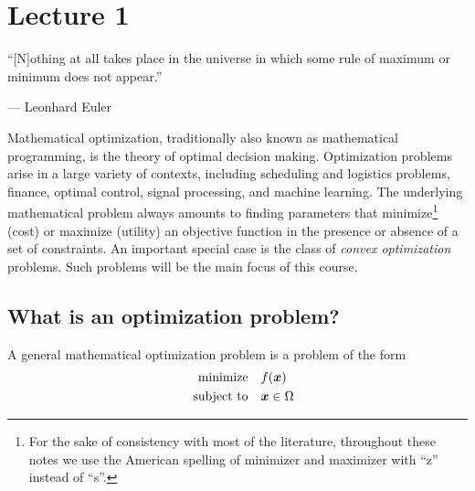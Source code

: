 %
%
% 


\chapter*{Lecture 1}
\addtocounter{chapter}{1}

\epigraph{``[N]othing at all takes place in the universe in which some rule of maximum or minimum does not appear.''}{--- \textup{Leonhard Euler}}

Mathematical optimization, traditionally also known as mathematical programming, is the theory of optimal decision making. Optimization problems arise in a large variety of contexts, including scheduling and logistics problems, finance, optimal control, signal processing, and machine learning. The underlying mathematical problem always amounts to finding parameters that minimize\footnote{For the sake of consistency with most of the literature, throughout these notes we use the American spelling of minimizer and maximizer with ``z'' instead of ``s''.} (cost) or maximize (utility) an objective function in the presence or absence of a set of constraints. An important special case is the class of {\em convex optimization} problems. Such problems will be the main focus of this course.

\section{What is an optimization problem?}
A general mathematical optimization problem is a problem of the form
\begin{align}\label{eq:opt-form}
\begin{split}
 \text{minimize}\quad & f(\bm{x})\\
 \quad\text{subject to}\quad & \bm{x}\in \Omega
 \end{split}
\end{align}

